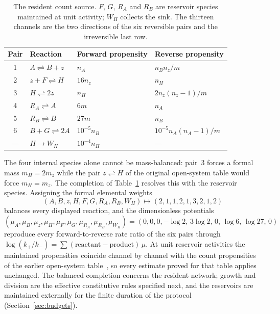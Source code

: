 \documentclass[11pt,a4paper]{article}
\theoremstyle{plain}
\theoremstyle{definition}
\theoremstyle{remark}
\newcommand{\Hs}{H}
\begin{document}
\begin{table}[tb]
\centering\small
\caption{The resident count source. $F$, $G$, $R_A$ and $R_B$ are reservoir species maintained at unit activity; $W_\Hs$ collects the sink. The thirteen channels are the two directions of the six reversible pairs and the irreversible last row.}
\label{tab:source}
\begin{tabular}{clll}
\toprule
Pair & Reaction & Forward propensity & Reverse propensity\\
\midrule
1 & $A\rightleftharpoons B+z$ & $n_A$ & $n_Bn_z/m$\\
2 & $z+F\rightleftharpoons \Hs$ & $16n_z$ & $n_\Hs$\\
3 & $\Hs\rightleftharpoons 2z$ & $n_\Hs$ & $2n_z(n_z-1)/m$\\
4 & $R_A\rightleftharpoons A$ & $6m$ & $n_A$\\
5 & $R_B\rightleftharpoons B$ & $27m$ & $n_B$\\
6 & $B+G\rightleftharpoons 2A$ & $10^{-5}n_B$ & $10^{-5}n_A(n_A-1)/m$\\
--- & $\Hs\longrightarrow W_\Hs$ & $10^{-4}n_\Hs$ & ---\\
\bottomrule
\end{tabular}
\end{table}

The four internal species alone cannot be mass-balanced: pair~3 forces a formal mass $m_\Hs=2m_z$ while the pair $z\rightleftharpoons\Hs$ of the original open-system table would force $m_\Hs=m_z$. The completion of Table~\ref{tab:source} resolves this with the reservoir species. Assigning the formal elemental weights
\begin{equation}\label{eq:element}
(A,B,z,\Hs,F,G,R_A,R_B,W_\Hs)\mapsto(2,1,1,2,1,3,2,1,2)
\end{equation}
balances every displayed reaction, and the dimensionless potentials
\begin{equation}\label{eq:potential}
(\mu_A,\mu_B,\mu_z,\mu_\Hs,\mu_F,\mu_G,\mu_{R_A},\mu_{R_B},\mu_{W_\Hs})=(0,0,0,-\log2,\,3\log2,\,0,\,\log6,\,\log27,\,0)
\end{equation}
reproduce every forward-to-reverse rate ratio of the six pairs through $\log(k_+/k_-)=\sum(\text{reactant}-\text{product})\,\mu$. At unit reservoir activities the maintained propensities coincide channel by channel with the count propensities of the earlier open-system table~\citep{copying2026,batch2026}, so every estimate proved for that table applies unchanged. The balanced completion concerns the resident network; growth and division are the effective constitutive rules specified next, and the reservoirs are maintained externally for the finite duration of the protocol (Section~\ref{sec:budgets}).
\end{document}
